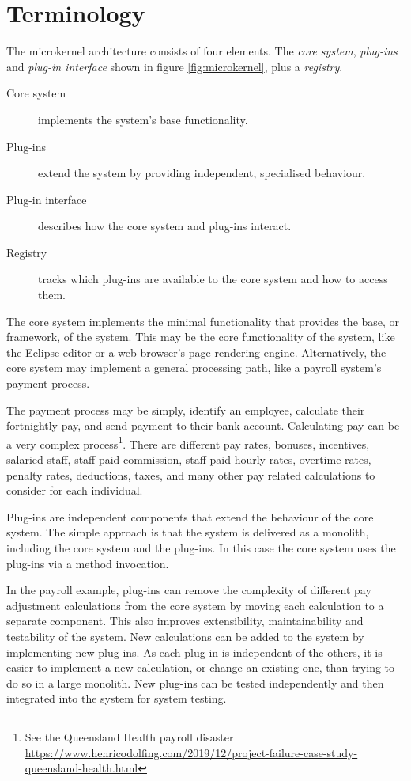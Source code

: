 \section{Terminology}

The microkernel architecture consists of four elements.
The \emph{core system}, \emph{plug-ins} and \emph{plug-in interface} shown in figure \ref{fig:microkernel}, plus a \emph{registry}.

\begin{description}
    \item[Core system] implements the system's base functionality.
    \item[Plug-ins] extend the system by providing independent, specialised behaviour.
    \item[Plug-in interface] describes how the core system and plug-ins interact.
    \item[Registry] tracks which plug-ins are available to the core system and how to access them.
\end{description}

The core system implements the minimal functionality that provides the base, or framework, of the system.
This may be the core functionality of the system, like the Eclipse editor or a web browser's page rendering engine.
Alternatively, the core system may implement a general processing path, like a payroll system's payment process.

The payment process may be simply, identify an employee, calculate their fortnightly pay, and send payment to their bank account.
Calculating pay can be a very complex process\footnote{\raggedright See the Queensland Health payroll disaster
\url{https://www.henricodolfing.com/2019/12/project-failure-case-study-queensland-health.html}}.
There are different pay rates, bonuses, incentives, salaried staff, staff paid commission, staff paid hourly rates,
overtime rates, penalty rates, deductions, taxes, and many other pay related calculations to consider for each individual.

Plug-ins are independent components that extend the behaviour of the core system.
The simple approach is that the system is delivered as a monolith, including the core system and the plug-ins.
In this case the core system uses the plug-ins via a method invocation.

In the payroll example, plug-ins can remove the complexity of different pay adjustment calculations from the core system
by moving each calculation to a separate component.
This also improves extensibility, maintainability and testability of the system.
New calculations can be added to the system by implementing new plug-ins.
As each plug-in is independent of the others, it is easier to implement a new calculation, or change an existing one,
than trying to do so in a large monolith.
New plug-ins can be tested independently and then integrated into the system for system testing.

